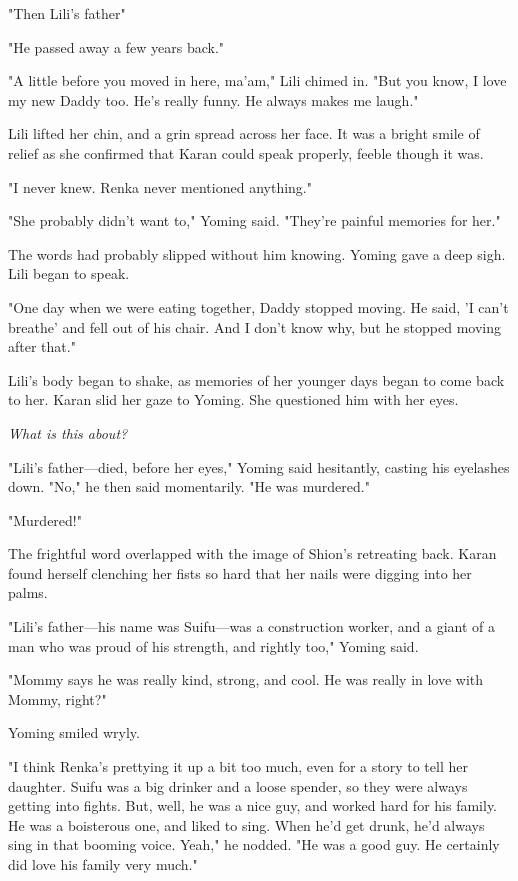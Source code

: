 "Then Lili's father\el "

"He passed away a few years back."

"A little before you moved in here, ma'am," Lili chimed in. "But you
know, I love my new Daddy too. He's really funny. He always makes me
laugh."

Lili lifted her chin, and a grin spread across her face. It was a bright
smile of relief as she confirmed that Karan could speak properly, feeble
though it was.

"I never knew. Renka never mentioned anything."

"She probably didn't want to," Yoming said. "They're painful memories
for her."

The words had probably slipped without him knowing. Yoming gave a deep
sigh. Lili began to speak.

"One day when we were eating together, Daddy stopped moving. He said, 'I
can't breathe' and fell out of his chair. And I don't know why, but he
stopped moving after that."

Lili's body began to shake, as memories of her younger days began to
come back to her. Karan slid her gaze to Yoming. She questioned him with
her eyes.

\emph{What is this about?}

"Lili's father---died, before her eyes," Yoming said hesitantly, casting
his eyelashes down. "No," he then said momentarily. "He was murdered."

"Murdered!"

The frightful word overlapped with the image of Shion's retreating back.
Karan found herself clenching her fists so hard that her nails were
digging into her palms.

"Lili's father---his name was Suifu---was a construction worker, and a giant
of a man who was proud of his strength, and rightly too," Yoming said.

"Mommy says he was really kind, strong, and cool. He was really in love
with Mommy, right?"

Yoming smiled wryly.

"I think Renka's prettying it up a bit too much, even for a story to
tell her daughter. Suifu was a big drinker and a loose spender, so they
were always getting into fights. But, well, he was a nice guy, and
worked hard for his family. He was a boisterous one, and liked to sing.
When he'd get drunk, he'd always sing in that booming voice. Yeah," he
nodded. "He was a good guy. He certainly did love his family very much."

